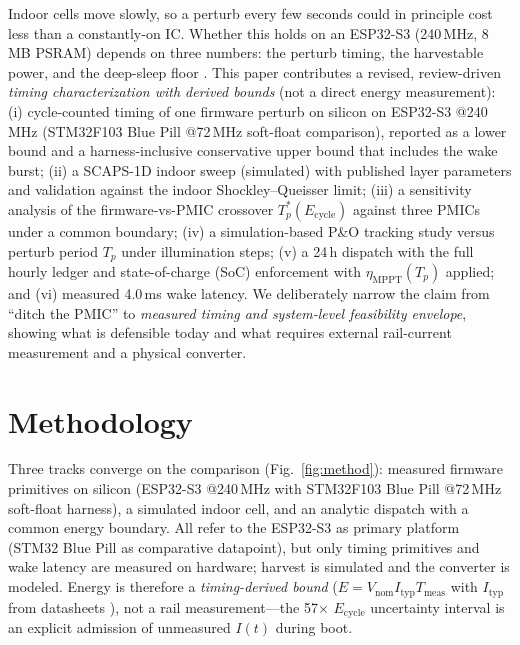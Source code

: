 \documentclass[10pt, conference, letterpaper]{IEEEtran}
\begin{document}
Indoor cells move slowly, so a perturb every few seconds could in principle cost less than a constantly-on IC. Whether this holds on an ESP32-S3 (240\,MHz, 8\,MB PSRAM) \cite{espressif_s3_datasheet,espressif_s3_trm} depends on three numbers: the perturb timing, the harvestable power, and the deep-sleep floor \cite{murtola2022,brunner2024harvestics}. This paper contributes a revised, review-driven \emph{timing characterization with derived bounds} (not a direct energy measurement): (i) cycle-counted timing of one firmware perturb on silicon on ESP32-S3 @240\,MHz (STM32F103 Blue Pill @72\,MHz soft-float comparison), reported as a lower bound and a harness-inclusive conservative upper bound that includes the wake burst; (ii) a SCAPS-1D indoor sweep (simulated) with published layer parameters and validation against the indoor Shockley--Queisser limit; (iii) a sensitivity analysis of the firmware-vs-PMIC crossover $T_p^*(E_{\mathrm{cycle}})$ against three PMICs under a common boundary; (iv) a simulation-based P\&O tracking study versus perturb period $T_p$ under illumination steps; (v) a 24\,h dispatch with the full hourly ledger and state-of-charge (SoC) enforcement with $\eta_{\mathrm{MPPT}}(T_p)$ applied; and (vi) measured 4.0\,ms wake latency. We deliberately narrow the claim from ``ditch the PMIC'' to \emph{measured timing and system-level feasibility envelope}, showing what is defensible today and what requires external rail-current measurement and a physical converter.

\section{Methodology}

Three tracks converge on the comparison (Fig.~\ref{fig:method}): measured firmware primitives on silicon (ESP32-S3 @240\,MHz with STM32F103 Blue Pill @72\,MHz soft-float harness), a simulated indoor cell, and an analytic dispatch with a common energy boundary. All refer to the ESP32-S3 as primary platform (STM32 Blue Pill as comparative datapoint), but only timing primitives and wake latency are measured on hardware; harvest is simulated and the converter is modeled. Energy is therefore a \emph{timing-derived bound} ($E=V_{\mathrm{nom}}I_{\mathrm{typ}}T_{\mathrm{meas}}$ with $I_{\mathrm{typ}}$ from datasheets \cite{espressif_s3_datasheet,st_stm32f103}), not a rail measurement---the 57$\times$ $E_{\mathrm{cycle}}$ uncertainty interval is an explicit admission of unmeasured $I(t)$ during boot.
\end{document}
